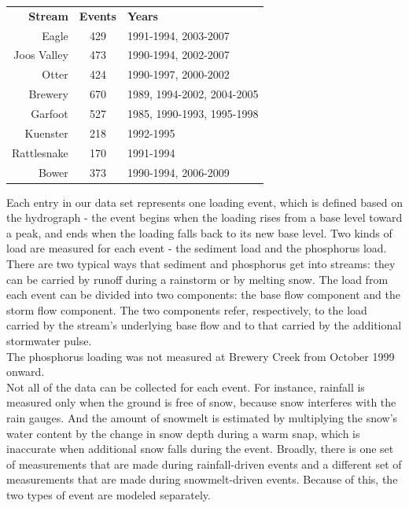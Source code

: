 \documentclass[10pt]{article}
\begin{document}
\begin{table}[h]
\begin{center}
\begin{tabular}{r c l}
        \textbf{Stream}  & \textbf{Events} & \textbf{Years}\\
        Eagle & 429 &1991-1994, 2003-2007\\
        Joos Valley & 473 & 1990-1994, 2002-2007\\
        Otter & 424 & 1990-1997, 2000-2002\\
        Brewery & 670 & 1989, 1994-2002, 2004-2005\\
        Garfoot & 527 & 1985, 1990-1993, 1995-1998\\
        Kuenster & 218 & 1992-1995\\
        Rattlesnake & 170 & 1991-1994\\
        Bower & 373 & 1990-1994, 2006-2009\\
    \end{tabular}
\end{center}
\end{table}

Each entry in our data set represents one loading event, which is defined based on the hydrograph - the event begins when the loading rises from a base level toward a peak, and ends when the loading falls back to its new base level. Two kinds of load are measured for each event - the sediment load and the phosphorus load. There are two typical ways that sediment and phosphorus get into streams: they can be carried by runoff during a rainstorm or by melting snow. The load from each event can be divided into two components: the base flow component and the storm flow component. The two components refer, respectively, to the load carried by the stream's underlying base flow and to that carried by the additional stormwater pulse.\\

The phosphorus loading was not measured at Brewery Creek from October 1999 onward.\\

Not all of the data can be collected for each event. For instance, rainfall is measured only when the ground is free of snow, because snow interferes with the rain gauges. And the amount of snowmelt is estimated by multiplying the snow's water content by the change in snow depth during a warm snap, which is inaccurate when additional snow falls during the event. Broadly, there is one set of measurements that are made during rainfall-driven events and a different set of measurements that are made during snowmelt-driven events. Because of this, the two types of event are modeled separately.\\
\end{document}

